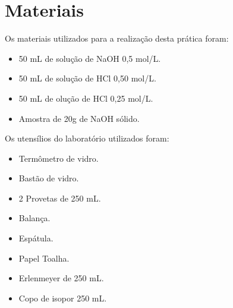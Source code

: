 
\section{Materiais}\label{sec:mat_materiais}
    \indent Os materiais utilizados para a realização desta prática foram:\
    
    \begin{itemize}
        \item 50 mL de solução de NaOH 0,5 mol/L.
        \item 50 mL de solução de HCl 0,50 mol/L.
        \item 50 mL de olução de HCl 0,25 mol/L.
        \item Amostra de 20g de NaOH sólido.
    \end{itemize}

    \indent Os utensílios do laboratório utilizados foram:\
    \begin{itemize}
        \item Termômetro de vidro.
        \item Bastão de vidro.
        \item 2 Provetas de 250 mL.
        \item Balança.
        \item Espátula.
        \item Papel Toalha.
        \item Erlenmeyer de 250 mL.
        \item Copo de isopor 250 mL.
    \end{itemize}